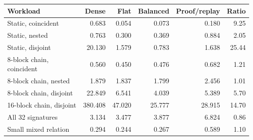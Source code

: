 \begin{tabular}{@{}lrrrrr@{}}
\toprule
Workload & Dense & Flat & Balanced & Proof/replay & Ratio\\
\midrule
Static, coincident & 0.683 & 0.054 & 0.073 & 0.180 & 9.25\\
Static, nested & 0.763 & 0.300 & 0.369 & 0.884 & 2.05\\
Static, disjoint & 20.130 & 1.579 & 0.783 & 1.638 & 25.44\\
8-block chain, coincident & 0.560 & 0.450 & 0.476 & 0.682 & 1.21\\
8-block chain, nested & 1.879 & 1.837 & 1.799 & 2.456 & 1.01\\
8-block chain, disjoint & 22.849 & 6.541 & 4.039 & 5.389 & 5.70\\
16-block chain, disjoint & 380.408 & 47.020 & 25.777 & 28.915 & 14.70\\
All 32 signatures & 3.134 & 3.477 & 3.877 & 6.824 & 0.86\\
Small mixed relation & 0.294 & 0.244 & 0.267 & 0.589 & 1.10\\
\bottomrule
\end{tabular}
